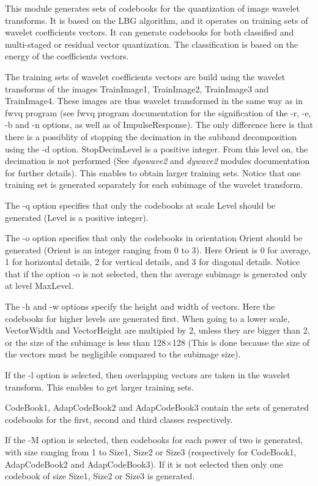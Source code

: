 This module generates sets of codebooks for the quantization 
of image wavelet transforms. It is based on the LBG algorithm, 
and it operates on training sets of wavelet coefficients vectors. 
It can generate codebooks for both classified and multi-staged 
or residual vector quantization. 
The classification is based on the energy of the coefficients vectors. 

The training sets of wavelet coefficients vectors are build using the 
wavelet transforms of the images TrainImage1, TrainImage2, TrainImage3 
and TrainImage4. These images are thus wavelet transformed in the same 
way as in fwvq program (see fwvq program documentation for the 
signification of the -r, -e, -b and -n options, as well as of 
ImpulseResponse). The only difference here is that there is a possiblity 
of stopping the decimation in the subband decomposition using the -d 
option. StopDecimLevel is a positive integer. From this level on, 
the decimation is not performed (See {\em dyowave2} and {\em dywave2} modules 
documentation for further details). This enables to obtain larger 
training sets. Notice that one training set is generated 
separately for each subimage of the wavelet transform. 

The -q option specifies that only the codebooks at scale Level 
should be generated (Level is a positive integer). 

The -o option specifies that only the codebooks in orientation 
Orient should be generated (Orient is an integer ranging from 0 to 3). 
Here Orient is 0 for average, 1 for horizontal details, 2 for vertical 
details, and 3 for diagonal details. Notice that if the option -o 
is not selected, then the average subimage is generated only at level 
MaxLevel. 

The -h and -w options specify the height and width of vectors. 
Here the codebooks for higher levels are generated first. 
When going to a lower scale, VectorWidth and VectorHeight are multipied 
by 2, unless they are bigger than 2, or the size of the subimage 
is less than 128$\times$128 (This is done because the size of the 
vectors must be negligible compared to the subimage size). 

If the -l option is selected, then overlapping vectors are taken in the 
wavelet transform. This enables to get larger training sets. 

CodeBook1, AdapCodeBook2 and AdapCodeBook3 contain the sets of generated 
codebooks for the first, second and third classes respectively. 

If the -M option is selected, then codebooks for each power of two is 
generated, with size ranging from 1 to Size1, Size2 or Size3 
(respectively for CodeBook1, AdapCodeBook2 and AdapCodeBook3). 
If it is not selected then only one codebook of size Size1, Size2 or Size3 
is generated. 

